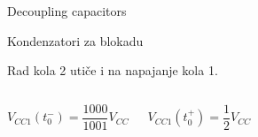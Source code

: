 \begin{frame}[label=08-s007]{Decoupling capacitors}

Kondenzatori za blokadu\par
\centering\par
\raggedright\smallskip Rad kola 2 utiče i na napajanje kola 1.\par\smallskip
\begin{columns}[c,onlytextwidth]
$V_{CC1}(t_0^-)=\dfrac{1000}{1001}V_{CC}$\par\medskip
$V_{CC1}(t_0^+)=\dfrac12 V_{CC}$\par\medskip

\end{columns}
\end{frame}
